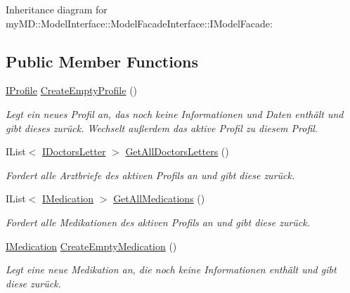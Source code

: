 Inheritance diagram for my\-MD::Model\-Interface::Model\-Facade\-Interface::IModel\-Facade:\subsection*{Public Member Functions}
\begin{CompactItemize}
\item 
\hyperlink{interfacemy_m_d_1_1_model_interface_1_1_data_model_interface_1_1_i_profile}{IProfile} \hyperlink{interfacemy_m_d_1_1_model_interface_1_1_model_facade_interface_1_1_i_model_facade_d81849285c0ecfe46b822095df995e8e}{Create\-Empty\-Profile} ()
\begin{CompactList}\small\item\em Legt ein neues Profil an, das noch keine Informationen und Daten enth\"{a}lt und gibt dieses zur\"{u}ck. Wechselt au\ss{}erdem das aktive Profil zu diesem Profil. \item\end{CompactList}\item 
IList$<$ \hyperlink{interfacemy_m_d_1_1_model_interface_1_1_data_model_interface_1_1_i_doctors_letter}{IDoctors\-Letter} $>$ \hyperlink{interfacemy_m_d_1_1_model_interface_1_1_model_facade_interface_1_1_i_model_facade_d824e78a8274c2fc04719a66a7030fd7}{Get\-All\-Doctors\-Letters} ()
\begin{CompactList}\small\item\em Fordert alle Arztbriefe des aktiven Profils an und gibt diese zur\"{u}ck. \item\end{CompactList}\item 
IList$<$ \hyperlink{interfacemy_m_d_1_1_model_interface_1_1_data_model_interface_1_1_i_medication}{IMedication} $>$ \hyperlink{interfacemy_m_d_1_1_model_interface_1_1_model_facade_interface_1_1_i_model_facade_ecff6715a9c8e9604242cc7a688c9939}{Get\-All\-Medications} ()
\begin{CompactList}\small\item\em Fordert alle Medikationen des aktiven Profils an und gibt diese zur\"{u}ck. \item\end{CompactList}\item 
\hyperlink{interfacemy_m_d_1_1_model_interface_1_1_data_model_interface_1_1_i_medication}{IMedication} \hyperlink{interfacemy_m_d_1_1_model_interface_1_1_model_facade_interface_1_1_i_model_facade_3fd69c99a27372f99eae3cda6e23e2e6}{Create\-Empty\-Medication} ()
\begin{CompactList}\small\item\em Legt eine neue Medikation an, die noch keine Informationen enth\"{a}lt und gibt diese zur\"{u}ck. \item\end{CompactList}\item 

\end{CompactItemize}
